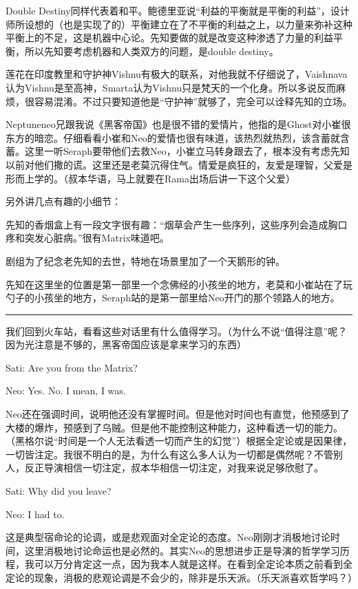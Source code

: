 \documentclass[UTF8]{ctexart}
\newcommand{\myparsep}{\noindent \rule[0.5ex]{\linewidth}{1pt}}
\newenvironment{myquote}{\color{green} \setlength{\leftskip}{6em} \setlength{\rightskip}{4em} \setlength{\parindent}{-2em}}{\par}
\begin{document}
Double Destiny同样代表着和平。鲍德里亚说“利益的平衡就是平衡的利益”，设计师所设想的（也是实现了的）平衡建立在了不平衡的利益之上，以力量来弥补这种平衡上的不足，这是机器中心论。先知要做的就是改变这种渗透了力量的利益平衡，所以先知要考虑机器和人类双方的问题，是double destiny。

莲花在印度教里和守护神Vishnu有极大的联系，对他我就不仔细说了，Vaishnava认为Vishnu是至高神，Smarta认为Vishnu只是梵天的一个化身。所以多说反而麻烦，很容易混淆。不过只要知道他是“守护神”就够了，完全可以诠释先知的立场。

Neptuneneo兄跟我说《黑客帝国》也是很不错的爱情片，他指的是Ghost对小崔很东方的暗恋。仔细看看小崔和Neo的爱情也很有味道，该热烈就热烈，该含蓄就含蓄。这里一听Seraph要带他们去救Neo，小崔立马转身跟去了，根本没有考虑先知以前对他们撒的谎。这里还是老莫沉得住气。情爱是疯狂的，友爱是理智，父爱是形而上学的。（叔本华语，马上就要在Rama出场后讲一下这个父爱）

另外讲几点有趣的小细节：

先知的香烟盒上有一段文字很有趣：“烟草会产生一些序列，这些序列会造成胸口疼和突发心脏病。”很有Matrix味道吧。

剧组为了纪念老先知的去世，特地在场景里加了一个天鹅形的钟。

先知在这里坐的位置是第一部里一个念佛经的小孩坐的地方，老莫和小崔站在了玩勺子的小孩坐的地方，Seraph站的是第一部里给Neo开门的那个领路人的地方。

\myparsep

我们回到火车站，看看这些对话里有什么值得学习。（为什么不说“值得注意”呢？因为光注意是不够的，黑客帝国应该是拿来学习的东西）

\begin{myquote}
Sati: Are you from the Matrix?

Neo: Yes. No. I mean, I was.
\end{myquote}

Neo还在强调时间，说明他还没有掌握时间。但是他对时间也有直觉，他预感到了大楼的爆炸，预感到了乌贼。但是他不能控制这种能力，这种看透一切的能力。（黑格尔说“时间是一个人无法看透一切而产生的幻觉”）根据全定论或是因果律，一切皆注定。我很不明白的是，为什么有这么多人认为一切都是偶然呢？不管别人，反正导演相信一切注定，叔本华相信一切注定，对我来说足够欣慰了。

\begin{myquote}
Sati: Why did you leave?

Neo: I had to.
\end{myquote}

这是典型宿命论的论调，或是悲观面对全定论的态度。Neo刚刚才消极地讨论时间，这里消极地讨论命运也是必然的。其实Neo的思想进步正是导演的哲学学习历程，我可以万分肯定这一点，因为我本人就是这样。在看到全定论本质之前看到全定论的现象，消极的悲观论调是不会少的，除非是乐天派。（乐天派喜欢哲学吗？）
\end{document}

